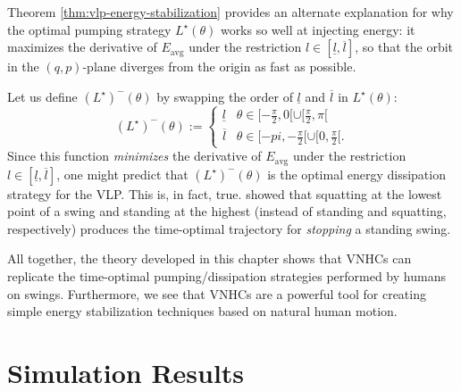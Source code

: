 Theorem \ref{thm:vlp-energy-stabilization} provides an alternate
explanation for why the optimal pumping strategy \(L^\star(\theta)\) works
so well at injecting energy: it maximizes the derivative of \(E_\text{avg}\)
under the restriction \(l \in [\underline{l},\overline{l}]\), so that the orbit
in the \((q,p)\)-plane diverges from the origin as fast as possible. 

Let us define \((L^\star)^{-}(\theta)\) by swapping the order of 
\(\underline{l}\) and \(\overline{l}\) in \(L^\star(\theta)\): 
\[
   (L^\star)^-(\theta) := \begin{cases}
      \underline{l} & \theta \in [-\frac{\pi}{2},0[ \cup [\frac{\pi}{2}, \pi[ \\
      \overline{l} & \theta \in [-pi, -\frac{\pi}{2}[ \cup [0,\frac{\pi}{2}[ 
      .
   \end{cases}
\]
Since this function \textit{minimizes} the derivative of \(E_\text{avg}\) under
the restriction \(l \in [\underline{l},\overline{l}]\), one might predict that 
\((L^\star)^{-}(\theta)\) is the optimal energy dissipation strategy for the VLP.
This is, in fact, true. \citet{pumping_swing_standing_squatting} showed 
that squatting at the lowest point of a swing and standing at the highest
(instead of standing and squatting, respectively) produces the
time-optimal trajectory for \textit{stopping} a standing swing. 

All together, the theory developed in this chapter shows that VNHCs can
replicate the time-optimal pumping/dissipation strategies performed by humans on
swings.
Furthermore, we see that VNHCs are a powerful tool for creating simple energy
stabilization techniques based on natural human motion.

\section{Simulation Results}

